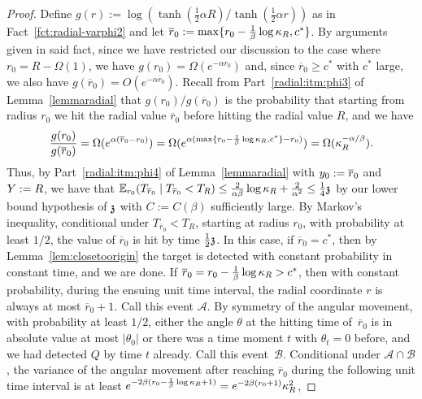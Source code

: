 \begin{proof}
Define $g(r):=\log(\tanh(\frac12 \alpha R)/\tanh(\frac12 \alpha r))$ as in Fact~\ref{fct:radial-varphi2} and let $\overline{r}_0:=\max\{r_0-\frac{1}{\beta}\log \KR, c^*\}$. By arguments given in said fact, since we have restricted our discussion to the case where $r_0=R-\Omega(1)$, we have $g(r_0)=\Omega(e^{-\alpha r_0})$ and, since $\overline{r}_0\geq c^*$ with $c^*$ large, we also have $g(\overline{r}_0)=O(e^{-\alpha \overline{r}_0})$. %
Recall from Part~\eqref{radial:itm:phi3} of Lemma~\ref{lemmaradial} that $g(r_0)/g(\overline{r}_0)$ is the probability that starting from radius $r_0$ we hit the radial value $\overline{r}_0$ before hitting the radial value $R$, and we have
$$
\frac{g(r_0)}{g(\overline{r}_0)}=\Omega(e^{\alpha(\overline{r}_0-r_0)})=
\Omega(e^{\alpha(\max\{r_0-\frac{1}{\beta}\log \KR, c^*\}-r_0)})=\Omega(\KR^{-\alpha/\beta}).
$$
Thus, by Part~\eqref{radial:itm:phi4} of Lemma~\ref{lemmaradial} with $\auxy_0:=\overline{r}_0$ and $\auxY:=R$, we have that $\EE_{r_0} (T_{\overline{r}_0} \mid T_{\overline{r}_0} < T_R) \le \frac{2}{\alpha\beta}\log \KR + \frac{2}{\alpha^2} \le \frac14\ss$ by our lower bound hypothesis of $\ss$ with $C:=C(\beta)$ sufficiently large. 
By Markov's inequality,  conditional under $T_{\overline{r}_0} < T_R$, starting at radius $r_0$, with probability at least $1/2$, the value of $\overline{r}_0$ is hit by time $\frac12\ss$. In this case, if $\overline{r}_0=c^*$, then by Lemma~\ref{lem:closetoorigin} the target is detected with constant probability in constant time, and we are done. If $\overline{r}_0 =r_0-\frac{1}{\beta}\log \KR > c^*$, then with constant probability, during the ensuing unit time interval, the radial coordinate $r$ is always at most $\overline{r}_0+1$. Call this event $\mathcal{A}$. By symmetry of the angular movement, with probability at least $1/2$, either the angle $\theta$ at the hitting time of~$\overline{r}_0$ is in absolute value at most $|\theta_0|$ or there was a time moment $t$ with $\theta_t=0$ before, and we had detected $Q$ by time $t$ already. Call this event~$\mathcal{B}$. Conditional under $\mathcal{A} \cap \mathcal{B}$, the variance of the angular movement after reaching $\overline{r}_0$ during the following unit time interval is at least 
$
e^{-2\beta (r_0-\frac{1}{\beta}\log\KR+1)} =e^{-2\beta (r_0+1)}\KR^2$,

\end{proof}
